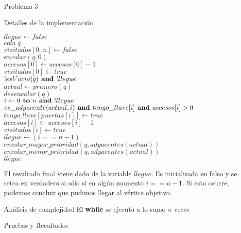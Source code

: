 \begin{section}{Problema 3}
\begin{subsection}{Detalles de la implementación}
		\begin{pseudo}
		\tab $llegue \leftarrow false$\\
		\tab $cola\; q$\\
		\tab $visitados[0..n] \leftarrow false$\\ 
		\tab $encolar(q,0)$\\
		\tab $accesos[0] \leftarrow accesos[0]-1$\\
		\tab $visitados[0] \leftarrow true$\\
		\tab \WHILE $!esVacia(q) \textbf{ and } !llegue$\\
		\tab \tab $actual \leftarrow primero(q)$\\
		\tab \tab $desencolar(q)$\\
		\tab \tab \FOR $ i\leftarrow0 \textbf{ to } n \textbf{ and } !llegue$\\
		\tab \tab \tab \IF $es\_adyacente(actual,i) \textbf{ and } tengo\_llave[i] \textbf{ and } accesos[i]>0$\\
		\tab \tab \tab \tab $tengo\_llave[puertas[i]] \leftarrow true$\\
		\tab \tab \tab \tab $accesos[i] \leftarrow accesos[i]-1$\\
		\tab \tab \tab \tab $visitados[i] \leftarrow true$\\
		\tab \tab \tab \tab $llegue \leftarrow (i == n-1)$\\
		\tab \tab $encolar\_mayor\_prioridad(q, adyacentes(actual))$\\
		\tab \tab $encolar\_menor\_prioridad(q, adyacentes(actual))$\\
		\tab \RET $llegue$\\
		\end{pseudo}

		El resultado final viene dado de la variable $llegue$. Es inicializada en falso y se setea en verdadero si sólo si en algún momento $i == n-1$. Si esto ocurre, podemos concluir que pudimos llegar al vértice objetivo.\\
	\end{subsection}


	\begin{subsection}{Análisis de complejidad}
		El \textbf{while} se ejecuta a lo sumo $n$ veces
		
	\end{subsection}


	\begin{subsection}{Pruebas y Resultados}

	\end{subsection}

\end{section}

